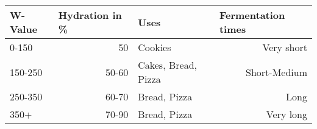 


\begin{tabular}{lrlr}
\toprule
\textbf{W-Value} & \multicolumn{1}{l}{\textbf{Hydration in \%}} & \textbf{Uses}       & \multicolumn{1}{l}{\textbf{Fermentation times}} \\ \midrule
0-150            & 50                                            & Cookies             & Very short                                       \\ \midrule
150-250          & 50-60                                         & Cakes, Bread, Pizza & Short-Medium                                     \\ \midrule
250-350          & 60-70                                         & Bread, Pizza        & Long                                             \\ \midrule
350+             & 70-90                                         & Bread,
Pizza        & Very long                                        \\ \bottomrule
\end{tabular}


